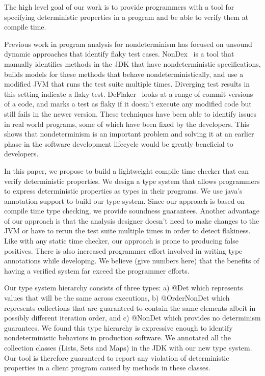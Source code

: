 The high level goal of our work is to provide programmers with a tool for
specifying deterministic properties in a program and be able to verify them
at compile time.


Previous work in program analysis for nondeterminism has focused on unsound dynamic
approaches that identify flaky test cases.
NonDex~\cite{nondex} is a tool that manually identifies methods in the JDK that have nondeterministic specifications, builds models for
these methods that behave nondeterministically, and  use a modified JVM that runs the test suite multiple times.
Diverging test results in this setting indicate a flaky test. DeFlaker~\cite{deflaker} looks at a range of commit versions
of a code, and marks a test as flaky if it doesn't execute any modified code but still fails in the newer version. These techniques
have been able to identify issues in real world programs, some of which have been fixed by the developers. This shows that nondeterminism
is an important problem and solving it at an earlier phase in the software development lifecycle would be greatly beneficial to 
developers. 

In this paper, we propose to build a lightweight compile time checker that can verify deterministic properties. We design a
type system that allows programmers to express deterministic properties as types in their programs. We use
java's annotation support to build our type system. Since our approach is based on compile time type checking, we provide
soundness guarantees. Another advantage of our approach
is that the analysis designer doesn't need to make changes to the JVM or have to rerun the test suite multiple times in order
to detect flakiness. Like with any static time checker, our approach is prone to producing false positives. There is also increased programmer effort involved in writing type annotations while developing.
We believe (give numbers here) that the benefits of having a verified system far exceed the programmer efforts.

Our type system hierarchy consists of three types: a) @Det which represents values that will be the same across executions,
b) @OrderNonDet which represents collections that are guaranteed to contain the same elements albeit in possibly
different iteration order, and c) @NonDet which provides no determinism guarantees.  We found this type hierarchy 
is expressive enough to identify nondeterministic behaviors in production software. We annotated all the collection
classes (Lists, Sets and Maps) in the JDK with our new type system. Our tool is therefore guaranteed to report any violation
of deterministic properties in a client program caused by methods in these classes. 

